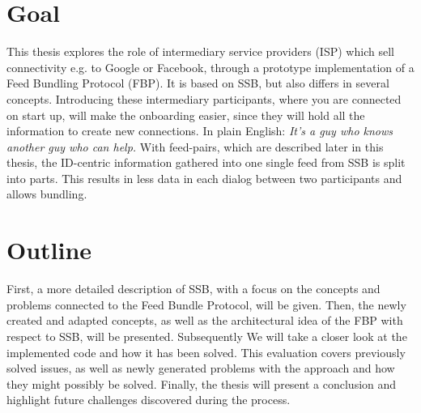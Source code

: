\section{Goal}
This thesis explores the role of intermediary service providers (ISP) which sell connectivity e.g. to Google or Facebook, through a prototype implementation of a Feed Bundling Protocol (FBP). It is based on SSB, but also differs in several concepts. Introducing these intermediary participants, where you are connected on start up, will make the onboarding easier, since they will hold all the information to create new connections. In plain English: \textit{It’s a guy who knows another guy who can help.} With feed-pairs, which are described later in this thesis, the ID-centric information gathered into one single feed from SSB is split into parts. This results in less data in each dialog between two participants and allows bundling. 

\section{Outline}
First, a more detailed description of SSB, with a focus on the concepts and problems connected to the Feed Bundle Protocol, will be given. Then, the newly created and adapted concepts, as well as the architectural idea of the FBP with respect to SSB, will be presented. Subsequently We will take a closer look at the implemented code and how it has been solved. This evaluation covers previously solved issues, as well as newly generated problems with the approach and how they might possibly be solved. Finally, the thesis will present a conclusion and highlight future challenges discovered during the process. 

